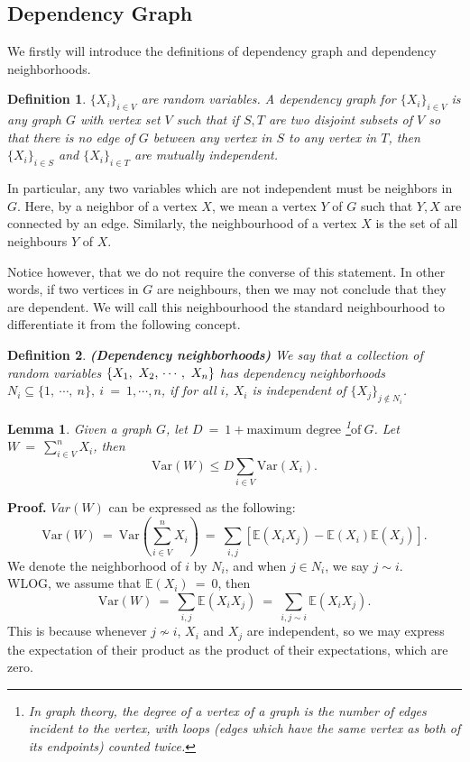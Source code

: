 \documentclass[12pt]{article}
\newcommand{\eq }{\: = \:}
\newtheorem{lemma}{Lemma}
\newtheorem{definition}{Definition}
\theoremstyle{nonumberplain}
\begin{document}
\subsection{Dependency Graph}

We firstly will introduce the definitions of dependency graph and dependency neighborhoods.

\pagebreak
\begin{definition}
$\{X_{i} \}_{i\in V}$ are random variables. A {\it dependency graph\/} for $\{X_{i} \}_{i\in V}$ is any graph $G$ with vertex set $V$ such that if $S,T$ are two disjoint subsets of $V$ so that there is no edge of $G$ between any vertex in $S$ to any vertex in $T$, then $\{X_{i} \}_{i\in S}$ and $\{X_{i} \}_{i\in T}$ are mutually independent. 
\end{definition}

In particular, any two variables which are not independent must be neighbors in $G$. Here, by a neighbor of a vertex $X$, we mean a vertex $Y$ of $G$ such that $Y, X$ are connected by an edge. Similarly, the neighbourhood of a vertex $X$ is the set of all neighbours $Y$ of $X$.

Notice however, that we do not require the converse of this statement. In other words, if two vertices in $G$ are neighbours, then we may not conclude that they are dependent. We will call this neighbourhood the standard neighbourhood to differentiate it from the following concept.

\begin{definition}
\textbf{(Dependency neighborhoods)} We say that a collection of random variables $\{X_{1},\ X_{2}, \\
\cdots,\ X_{n} \}$ has dependency neighborhoods $N_{i}\subseteq \{1,\ \cdots, \ n \},\ i\eq 1,\cdots, n$, if for all $i$, $X_{i}$ is independent of $\{X_{j} \}_{j\notin N_{i}}$.
\end{definition}

\begin{lemma}
Given a graph $G$, let $D\eq 1+\mbox{maximum degree}$ \footnote{In graph theory, the degree of a vertex of a graph is the number of edges incident to the vertex, with loops (edges which have the same vertex as both of its endpoints) counted twice.}$\mbox{of}\ G$. Let $W\eq \sum_{i\in V}^{n}X_{i}$, then 
\begin{equation}
\mathrm{Var}(W)\leq D\sum_{i\in V} \mathrm{Var}(X_{i}).
\end{equation}
\end{lemma}
\textbf{Proof.} $Var(W)$ can be expressed as the following:
$$
\mathrm{Var}(W)\eq \mathrm{Var}(\sum_{i\in V}^{n}X_{i})\eq \sum_{i,j}[\mathbb{E}(X_{i}X_{j})-\mathbb{E}(X_{i}) \mathbb{E}(X_{j})].
$$
We denote the neighborhood of $i$ by $N_{i}$, and when $j\in N_{i}$, we say $j\sim i$.\\
WLOG, we assume that $\mathbb{E}(X_{i})\eq 0$, then
$$
\mathrm{Var}(W)\eq \sum_{i,j} \mathbb{E}(X_{i}X_{j})\eq \sum_{i,j\sim i}\mathbb{E}(X_{i}X_{j}).
$$
This is because whenever $j \not \sim i$, $X_i$ and $X_j$ are independent, so we may express the expectation of their product as the product of their expectations, which are zero.
\end{document}
